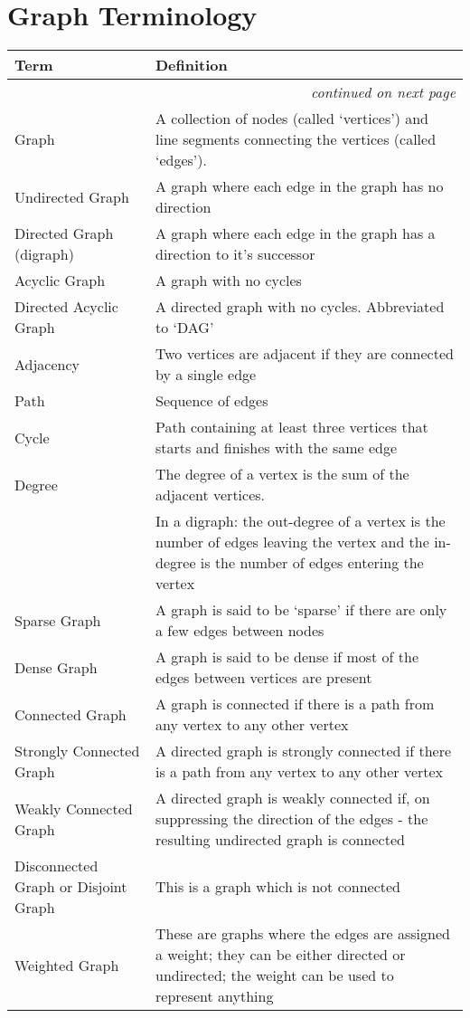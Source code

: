 \section{Graph Terminology}
{\RaggedRight \centering
    \begin{longtable}{p{} p{}}
    \textbf{Term} & \textbf{Definition}\\
    \hline
    \hline
    \endhead

    \multicolumn{2}{r}{\footnotesize\itshape continued on next page}\\
    \endfoot 

    \endlastfoot

    Graph & A collection of nodes (called `vertices') and line segments connecting the vertices (called `edges').\\
    \hline
    Undirected Graph & A graph where each edge in the graph has no direction\\
    \hline
    Directed Graph (digraph) & A graph where each edge in the graph has a direction to it's successor\\
    \hline
    Acyclic Graph & A graph with no cycles\\
    \hline
    Directed Acyclic Graph & A directed graph with no cycles. Abbreviated to `DAG'\\
    \hline
    Adjacency & Two vertices are adjacent if they are connected by a single edge\\
    \hline
    Path & Sequence of edges\\
    \hline
    Cycle & Path containing at least three vertices that starts and finishes with the same edge\\
    \hline
    Degree & The degree of a vertex is the sum of the adjacent vertices.\\
    & In a digraph: the out-degree of a vertex is the number of edges leaving the vertex and the in-degree is the number of edges entering the vertex\\
    \hline
    Sparse Graph & A graph is said to be `sparse' if there are only a few edges between nodes\\
    \hline
    Dense Graph & A graph is said to be dense if most of the edges between vertices are present\\
    \hline
    Connected Graph & A graph is connected if there is a path from any vertex to any other vertex\\
    \hline
    Strongly Connected Graph & A directed graph is strongly connected if there is a path from any vertex to any other vertex\\
    \hline
    Weakly Connected Graph & A directed graph is weakly connected if, on suppressing the direction of the edges - the resulting undirected graph is connected\\
    \hline
    Disconnected Graph or Disjoint Graph & This is a graph which is not connected\\
    \hline
    Weighted Graph & These are graphs where the edges are assigned a weight; they can be either directed or undirected; the weight can be used to represent anything\\
    \hline
    

\end{longtable}}
